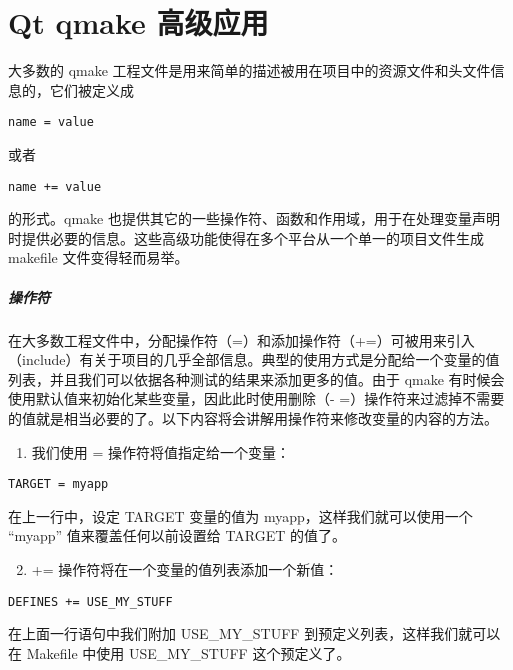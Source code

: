 \section{Qt qmake 高级应用}\label{qt-qmake-ux9ad8ux7ea7ux5e94ux7528-1}

大多数的 qmake
工程文件是用来简单的描述被用在项目中的资源文件和头文件信息的，它们被定义成

\begin{verbatim}
name = value
\end{verbatim}

或者

\begin{verbatim}
name += value
\end{verbatim}

的形式。qmake
也提供其它的一些操作符、函数和作用域，用于在处理变量声明时提供必要的信息。这些高级功能使得在多个平台从一个单一的项目文件生成
makefile 文件变得轻而易举。

\subparagraph{操作符}\label{ux64cdux4f5cux7b26}

在大多数工程文件中，分配操作符（=）和添加操作符（+=）可被用来引入（include）有关于项目的几乎全部信息。典型的使用方式是分配给一个变量的值列表，并且我们可以依据各种测试的结果来添加更多的值。由于
qmake 有时候会使用默认值来初始化某些变量，因此此时使用删除（-
=）操作符来过滤掉不需要的值就是相当必要的了。以下内容将会讲解用操作符来修改变量的内容的方法。

\begin{enumerate}

\item
  我们使用 = 操作符将值指定给一个变量：
\end{enumerate}

\begin{verbatim}
TARGET = myapp
\end{verbatim}

在上一行中，设定 TARGET 变量的值为 myapp，这样我们就可以使用一个
``myapp'' 值来覆盖任何以前设置给 TARGET 的值了。

\begin{enumerate}
\setcounter{enumi}{1}

\item
  += 操作符将在一个变量的值列表添加一个新值：
\end{enumerate}

\begin{verbatim}
DEFINES += USE_MY_STUFF
\end{verbatim}

在上面一行语句中我们附加 USE\_MY\_STUFF 到预定义列表，这样我们就可以在
Makefile 中使用 USE\_MY\_STUFF 这个预定义了。

